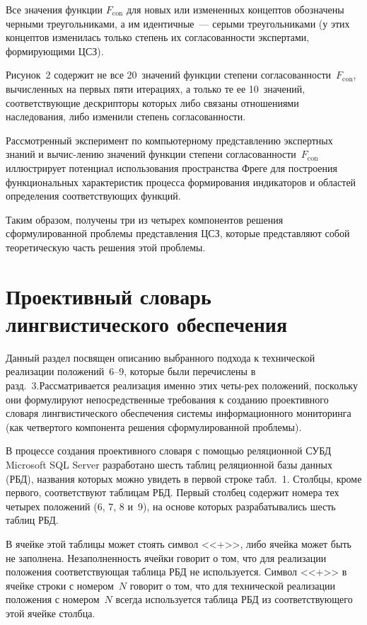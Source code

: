 \begin{multicols}{2}
   Все значения функции $F_{\mathrm{con}}$ для новых или измененных концептов обозначены 
черными треугольниками, а им идентичные~--- серыми треугольниками (у этих концептов 
изменилась только степень их согласованности экспертами, формирующими ЦСЗ).
   
   Рисунок~2 содержит не все 20~значений функции степени согласованности~$F_{\mathrm{con}}$, 
вычисленных на первых пяти итерациях, а только те ее 10~значений, соответствующие 
дескрипторы которых либо связаны отношениями наследования, либо изменили степень 
согласованности.
   
   Рассмотренный эксперимент по компьютерному представлению экспертных знаний и 
вы\-чис-\linebreak ле\-нию значений функции степени со\-гла\-со\-ван\-ности~$F_{\mathrm{con}}$ иллюстрирует 
потенциал использования пространства Фреге для построения функциональных 
характеристик процесса формирования индикаторов и областей определения 
соответствующих функций.
   
   Таким образом, получены три из четырех компонентов решения сформулированной 
проблемы представления ЦСЗ, которые представляют собой теоретическую часть решения 
этой проблемы. 
   
\section{Проективный словарь лингвистического обеспечения}
   
   Данный раздел посвящен описанию выбранного подхода к технической реализации 
положений~6--9, которые были перечислены в разд.~3.\linebreak Рассматривается реализация именно 
этих четы-\linebreak рех
положений, поскольку они формулируют непосредственные требования к 
созданию проективного словаря лингвистического обеспечения\linebreak
 сис\-те\-мы информационного 
мониторинга (как чет\-вер\-то\-го компонента решения сформулированной проб\-лемы).
   
   В процессе создания проективного словаря с помощью реляционной СУБД Microsoft SQL 
\mbox{Server} разработано шесть таблиц реляционной базы данных (РБД), названия которых можно 
увидеть в первой строке табл.~1. Столбцы, кроме первого, соответствуют 
таблицам РБД. Первый столбец содержит номера тех четырех 
положений (6, 7, 8 и~9), на основе которых разрабатывались шесть таблиц РБД.
   
   В ячейке этой таблицы может стоять символ <<+>>, либо ячейка может быть не 
заполнена. Незаполненность ячейки говорит о том, что для реализации положения 
соответствующая таблица РБД не используется. Символ <<+>> в ячейке строки с 
номером~$N$ говорит о том, что для технической реализации положения с номером~$N$ 
всегда используется таблица РБД из соответствующего этой ячейке столбца.


\end{multicols}
